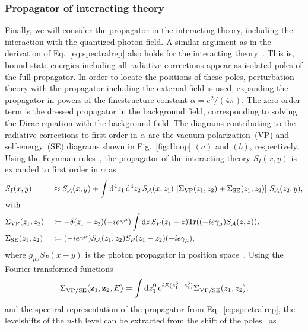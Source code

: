 \subsubsection*{Propagator of interacting theory}
Finally, we will consider the propagator in the interacting theory, including the interaction with the quantized photon field. A similar argument as in the derivation of Eq.~\eqref{eq:spectralrep} also holds for the interacting theory~\cite[Section 14.2.]{weinberg2005}. This is, bound state energies including all radiative corrections appear as isolated poles of the full propagator. In order to locate the positions of these poles, perturbation theory with the propagator including the external field is used, expanding the propagator in powers of the finestructure constant $\alpha=e^2/(4\pi)$. The zero-order term is the dressed propagator in the background field, corresponding to solving the Dirac equation with the background field. The diagrams contributing to the radiative corrections to first order in $\alpha$ are the vacuum-polarization~(VP) and self-energy~(SE) diagrams shown in Fig.~\ref{fig:1loop} $(a)$ and $(b)$, respectively. Using the Feynman rules~\mbox{\cite[Section 6.1.]{itzykson2005}}, the propagator of the interacting theory $S_{I}(x,y)$ is expanded to first order in $\alpha$ as
\begin{alignat}{2}
&S_{I}(x,y) &&\approx S_{\mathcal{A}}(x,y) + \int \mathrm{d}^4z_1\,\mathrm{d}^4z_2\,
S_{\mathcal{A}}(x,z_1)\,\left[\Sigma_{\text{VP}}(z_1,z_2)+\Sigma_{\text{SE}}(z_1,z_2)\right]\,S_{\mathcal{A}}(z_2,y),\notag\\
&\text{with }\notag\\
&\Sigma_{\text{VP}}(z_1,z_2)&&\coloneqq-\delta(z_1-z_2)(-ie\gamma^\mu)\int \text{d}z\,S_P(z_1-z)\mathrm{Tr} ((-ie\gamma_\mu)S_{\mathcal{A}}(z,z)),\notag\\
&\Sigma_{\text{SE}}(z_1,z_2)&&\coloneqq(-ie\gamma^\mu)S_{\mathcal{A}}(z_1,z_2)S_P(z_1-z_2)(-ie\gamma_\mu),
\end{alignat}
where $g_{\mu\nu}S_P(x-y)$ is the photon propagator in position space~\mbox{\cite[Section 3.2.]{itzykson2005}}. Using the Fourier transformed functions
\begin{equation}
\Sigma_{\text{VP/SE}}(\mathbf{z}_1,\mathbf{z}_2,E)= \int \text{d}z_1^0\, \text{e}^{iE(z_1^0-z_2^0)}\Sigma_{\text{VP/SE}}(z_1,z_2),
\end{equation}
and the spectral representation of the propagator from Eq.~\eqref{eq:spectralrep}, the levelshifts of the $n$-th level can be extracted from the shift of the poles~\mbox{\cite[Section 14.2.]{weinberg2005}} as
